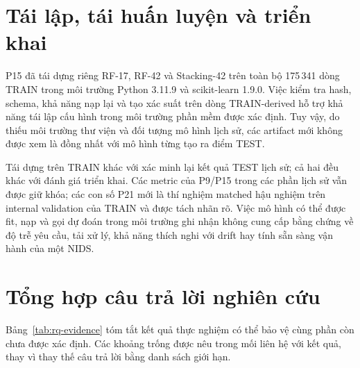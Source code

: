 \section{Tái lập, tái huấn luyện và triển khai}
\label{sec:discussion-reproducibility}

P15 đã tái dựng riêng RF-17, RF-42 và Stacking-42 trên toàn bộ 175\,341 dòng TRAIN trong môi trường Python 3.11.9 và scikit-learn 1.9.0. Việc kiểm tra hash, schema, khả năng nạp lại và tạo xác suất trên dòng TRAIN-derived hỗ trợ khả năng tái lập cấu hình trong môi trường phần mềm được xác định. Tuy vậy, do thiếu môi trường thư viện và đối tượng mô hình lịch sử, các artifact mới không được xem là đồng nhất với mô hình từng tạo ra điểm TEST.

Tái dựng trên TRAIN khác với xác minh lại kết quả TEST lịch sử; cả hai đều khác với đánh giá triển khai. Các metric của P9/P15 trong các phần lịch sử vẫn được giữ khóa; các con số P21 mới là thí nghiệm matched hậu nghiệm trên internal validation của TRAIN và được tách nhãn rõ. Việc mô hình có thể được fit, nạp và gọi dự đoán trong môi trường ghi nhận không cung cấp bằng chứng về độ trễ yêu cầu, tải xử lý, khả năng thích nghi với drift hay tính sẵn sàng vận hành của một NIDS.

\section{Tổng hợp câu trả lời nghiên cứu}
\label{sec:revision-rq-map}

Bảng~\ref{tab:rq-evidence} tóm tắt kết quả thực nghiệm có thể bảo vệ cùng phần còn chưa được xác định. Các khoảng trống được nêu trong mối liên hệ với kết quả, thay vì thay thế câu trả lời bằng danh sách giới hạn.

